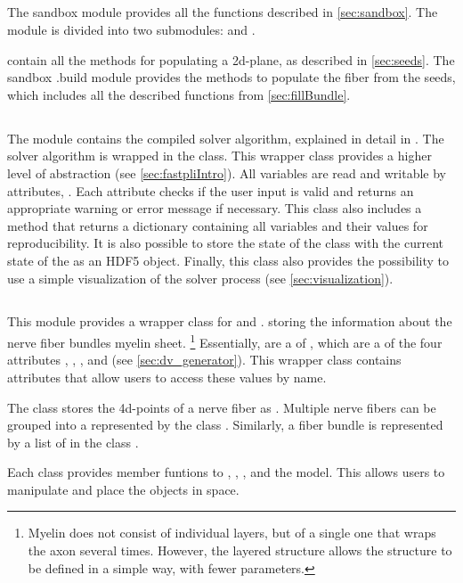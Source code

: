 \subsection{}
%
The sandbox module provides all the functions described in \cref{sec:sandbox}.
The module is divided into two submodules:  and .
\par
% 
 contain all the methods for populating a 2d-plane, as described in \cref{sec:seeds}.
The sandbox .build module provides the methods to populate the fiber from the seeds, which includes all the described functions from \cref{sec:fillBundle}.
%
%
%
\subsection{}
%
The module  contains the compiled solver algorithm, explained in detail in .
The solver algorithm is wrapped in the  class.
This wrapper class provides a higher level of abstraction (see \cref{sec:fastpliIntro}).
All variables are read and writable by attributes, \eg{} .
Each attribute checks if the user input is valid and returns an appropriate warning or error message if necessary.
This class also includes a  method that returns a \python{} dictionary containing all variables and their values for reproducibility.
It is also possible to store the state of the class with the current state of the  as an \ac{HDF5} object.
Finally, this class also provides the possibility to use a simple visualization of the solver process (see \cref{sec:visualization}).
%
%
%
\subsection{}
%
This module provides a wrapper class for  and .
 storing the information about the nerve fiber bundles myelin sheet. \footnote{Myelin does not consist of individual layers, but of a single one that wraps the axon several times. However, the layered structure allows the structure to be defined in a simple way, with fewer parameters.}
Essentially,  are a  of , which are a  of the four attributes , , , and  (see \cref{sec:dv_generator}).
This wrapper class contains attributes that allow users to access these values by name.
\par
% 
The class  stores the 4d-points of a nerve fiber as .
Multiple nerve fibers can be grouped into a  represented by the class .
Similarly, a fiber bundle is represented by a list of  in the class .
\par
% 
Each class provides member funtions to , , , and  the model.
This allows users to manipulate and place the objects in space.
%
%
%
